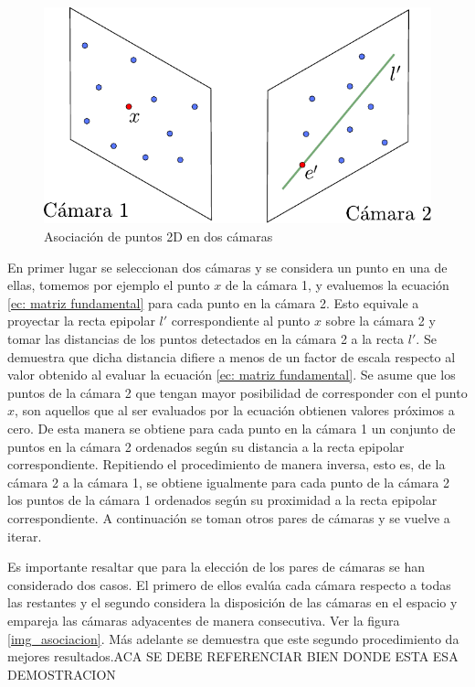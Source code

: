 \begin{figure}[H]
\begin{center}
\includegraphics[scale=0.7]{img/Reconstruccion/cam2cam.pdf}
\end{center}
\caption{Asociación de puntos 2D en dos cámaras}
\label{fig: cam2cam }
\end{figure}

En primer lugar se seleccionan dos cámaras y se considera un punto en una de ellas, tomemos por ejemplo el punto $x$ de la cámara 1, y evaluemos la ecuación \ref{ec: matriz fundamental} para cada punto en la cámara 2. Esto equivale a proyectar la recta epipolar $l'$ correspondiente al punto $x$ sobre la cámara 2  y tomar las distancias de los puntos detectados en la cámara 2 a la recta $l'$. Se demuestra que dicha distancia difiere a menos de un factor de escala respecto al valor obtenido al evaluar la ecuación \ref{ec: matriz fundamental}. Se asume que los puntos de la cámara 2 que tengan mayor posibilidad de corresponder con el punto $x$, son aquellos que al ser evaluados por la ecuación obtienen valores próximos a cero.
De esta manera se obtiene para cada punto en la cámara 1 un conjunto de puntos en la cámara 2 ordenados según su distancia a la recta epipolar correspondiente.
Repitiendo el procedimiento de manera inversa, esto es, de la cámara 2 a la cámara 1, se obtiene igualmente para cada punto de la cámara 2  los puntos de la cámara 1 ordenados según su proximidad a la recta epipolar correspondiente. A continuación se toman otros pares de cámaras y se vuelve a iterar. 

Es importante resaltar que para la elección de los pares de cámaras se han considerado dos casos.
El primero de ellos evalúa cada cámara respecto a todas las restantes y el segundo considera la disposición de las cámaras en el espacio y empareja las cámaras adyacentes de manera consecutiva. Ver la figura \ref{img_asociacion}. Más adelante se demuestra que este segundo procedimiento da mejores resultados.ACA SE DEBE REFERENCIAR BIEN DONDE ESTA ESA DEMOSTRACION \\

